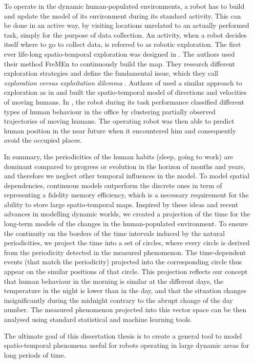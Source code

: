 To operate in the dynamic human-populated environments, a robot has to build and update the model of its environment during its standard activity.
This can be done in an active way, by visiting locations unrelated to an actually performed task, simply for the purpose of data collection.
An activity, when a robot decides itself where to go to collect data, is referred to as robotic exploration.
The first ever life-long spatio-temporal exploration was designed in \cite{Krajnik2015Lifelong}.
The authors used their method FreMEn \cite{krajnik2017fremen} to continuously build the map.
They research different exploration strategies and define the fundamental issue, which they call \textit{exploration versus exploitation dilemma} \cite{kulich2016explore}.
Authors of \cite{Molina2019Go} used a similar approach to exploration as in \cite{Krajnik2015Lifelong} and built the spatio-temporal model of directions and velocities of moving humans.
In \cite{Duckworth2016Unsupervised}, the robot during its task performance classified different types of human behaviour in the office by clustering partially observed trajectories of moving humans.
The operating robot was then able to predict human position in the near future when it encountered him and consequently avoid the occupied places. 



In summary, the periodicities of the human habits (sleep, going to work) are dominant compared to progress or evolution in the horizon of months and years, and therefore we neglect other temporal influences in the model.
To model spatial dependencies, continuous models outperform the discrete ones in term of representing a fidelity memory efficiency, which is a necessary requirement for the ability to store large spatio-temporal maps. 
Inspired by these ideas and recent advances in modelling dynamic worlds, we created a projection of the time for the long-term models of the changes in the human-populated environment.
To ensure the continuity on the borders of the time intervals induced by the natural periodicities, we project the time into a set of circles, where every circle is derived from the periodicity detected in the measured phenomenon.
The time-dependent events (that match the periodicity) projected into the corresponding circle thus appear on the similar positions of that circle.
This projection reflects our concept that human behaviour in the morning is similar at the different days, the temperature in the night is lower than in the day, and that the situation changes insignificantly during the midnight contrary to the abrupt change of the day number.
The measured phenomenon projected into this vector space can be then analysed using standard statistical and machine learning tools.

The ultimate goal of this dissertation thesis is to create a general tool to model spatio-temporal phenomena useful for robots operating in large dynamic areas for long periods of time.
